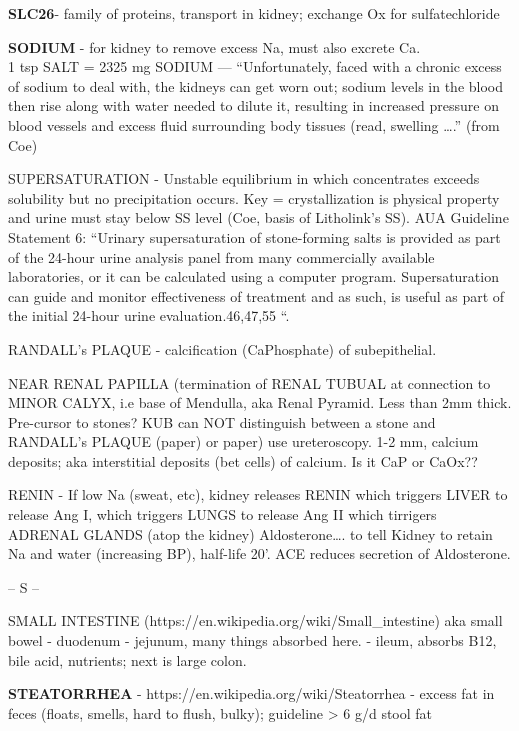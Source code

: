 \textbf{SLC26}- family of proteins, transport in kidney; exchange Ox for
sulfate\textbar chloride

\textbf{SODIUM} - for kidney to remove excess Na, must also excrete
Ca.\\
1 tsp SALT = 2325 mg SODIUM --- ``Unfortunately, faced with a chronic
excess of sodium to deal with, the kidneys can get worn out; sodium
levels in the blood then rise along with water needed to dilute it,
resulting in increased pressure on blood vessels and excess fluid
surrounding body tissues (read, swelling \ldots.'' (from Coe)

SUPERSATURATION - Unstable equilibrium in which concentrates exceeds
solubility but no precipitation occurs. Key = crystallization is
physical property and urine must stay below SS level (Coe, basis of
Litholink's SS). AUA Guideline Statement 6: ``Urinary supersaturation of
stone-forming salts is provided as part of the 24-hour urine analysis
panel from many commercially available laboratories, or it can be
calculated using a computer program. Supersaturation can guide and
monitor effectiveness of treatment and as such, is useful as part of the
initial 24-hour urine evaluation.46,47,55 ``.

RANDALL's PLAQUE - calcification (CaPhosphate) of subepithelial.

NEAR RENAL PAPILLA (termination of RENAL TUBUAL at connection to MINOR
CALYX, i.e base of Mendulla, aka Renal Pyramid. Less than 2mm thick.
Pre-cursor to stones? KUB can NOT distinguish between a stone and
RANDALL's PLAQUE (paper) or paper) use ureteroscopy. 1-2 mm, calcium
deposits; aka interstitial deposits (bet cells) of calcium. Is it CaP or
CaOx??

RENIN - If low Na (sweat, etc), kidney releases RENIN which triggers
LIVER to release Ang I, which triggers LUNGS to release Ang II which
tirrigers ADRENAL GLANDS (atop the kidney) Aldosterone\ldots. to tell
Kidney to retain Na and water (increasing BP), half-life 20'. ACE
reduces secretion of Aldosterone.

-- S --

SMALL INTESTINE (https://en.wikipedia.org/wiki/Small\_intestine) aka
small bowel - duodenum - jejunum, many things absorbed here. - ileum,
absorbs B12, bile acid, nutrients; next is large colon.

\textbf{STEATORRHEA} - https://en.wikipedia.org/wiki/Steatorrhea -
excess fat in feces (floats, smells, hard to flush, bulky); guideline
\textgreater{} 6 g/d stool fat


